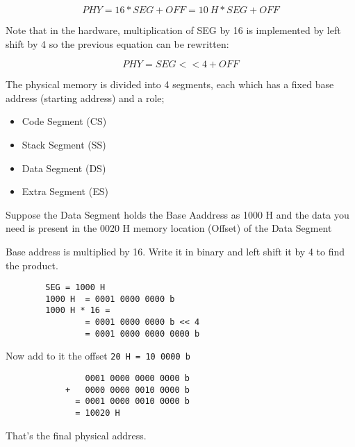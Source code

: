 \documentclass[a4paper]{article}
\begin{document}
\begin{equation}
	PHY = 16*SEG + OFF = 10\ H * SEG + OFF 
\end{equation}

Note that in the hardware, multiplication of SEG by 16 is implemented by left shift by 4 so the previous equation can be rewritten:

\begin{equation}
	PHY = SEG << 4 + OFF
\end{equation}

The physical memory is divided into 4 segments, each which has a fixed base address (starting address) and a role;

\begin{itemize}
	\item Code Segment (CS)
\item Stack Segment (SS)
 \item Data Segment (DS)
 \item Extra Segment (ES)
\end{itemize}
\begin{exmp}
	Suppose the Data Segment holds the Base Aaddress as 1000 H and the data you need is present in the 0020 H memory location (Offset) of the Data Segment
\end{exmp}
\begin{soln}
Base address is multiplied by 16. Write it in binary and left shift it by 4 to find the product.
	\begin{verbatim}
		SEG = 1000 H
		1000 H 	= 0001 0000 0000 b
		1000 H * 16 =
				= 0001 0000 0000 b << 4
				= 0001 0000 0000 0000 b
	\end{verbatim}
	Now add to it the offset \texttt{20 H = 10 0000 b}
	\begin{verbatim}
				0001 0000 0000 0000 b
		 	+	0000 0000 0010 0000 b
			  = 0001 0000 0010 0000 b
			  = 10020 H
	\end{verbatim}
	That's the final physical address.
	\qedblack
\end{soln}
\end{document}
